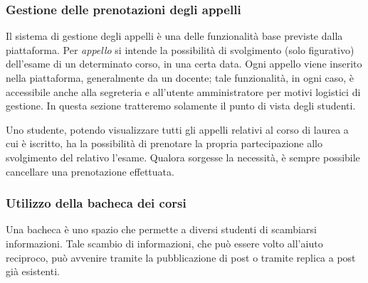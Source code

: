 \documentclass [a4paper,11pt]{book}
\begin{document}
\medskip

\subsubsection{Gestione delle prenotazioni degli appelli}

Il sistema di gestione degli appelli è una delle funzionalità base previste dalla piattaforma. Per \emph{appello} si intende la possibilità di svolgimento (solo figurativo) dell'esame di un determinato corso, in una certa data. Ogni appello viene inserito nella piattaforma, generalmente da un docente; tale funzionalità, in ogni caso, è accessibile anche alla segreteria e all'utente amministratore per motivi logistici di gestione. In questa sezione tratteremo solamente il punto di vista degli studenti.

Uno studente, potendo visualizzare tutti gli appelli relativi al corso di laurea a cui è iscritto, ha la possibilità di prenotare la propria partecipazione allo svolgimento del relativo l'esame. Qualora sorgesse la necessità, è sempre possibile cancellare una prenotazione effettuata.

\medskip

\subsubsection{Utilizzo della bacheca dei corsi}

\label{sec:bacheca}

Una bacheca è uno spazio che permette a diversi studenti di scambiarsi informazioni. Tale scambio di informazioni, che può essere volto all'aiuto reciproco, può avvenire tramite la pubblicazione di post o tramite replica a post già esistenti.
\end{document}
